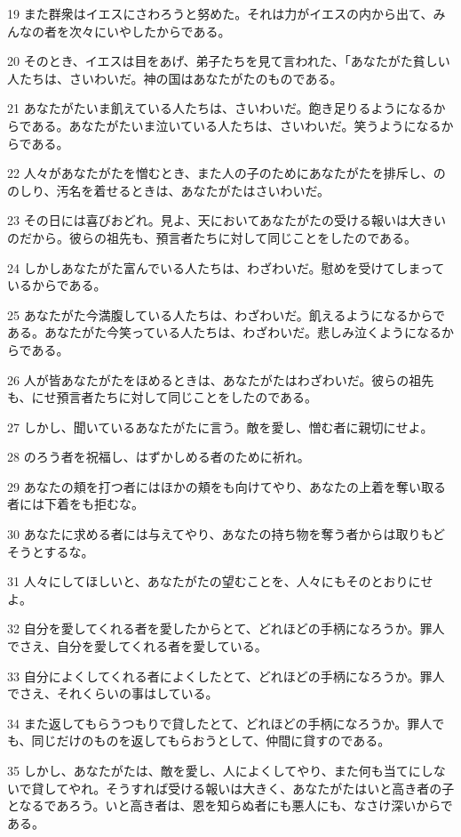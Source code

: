 \par 19 また群衆はイエスにさわろうと努めた。それは力がイエスの内から出て、みんなの者を次々にいやしたからである。
\par 20 そのとき、イエスは目をあげ、弟子たちを見て言われた、「あなたがた貧しい人たちは、さいわいだ。神の国はあなたがたのものである。
\par 21 あなたがたいま飢えている人たちは、さいわいだ。飽き足りるようになるからである。あなたがたいま泣いている人たちは、さいわいだ。笑うようになるからである。
\par 22 人々があなたがたを憎むとき、また人の子のためにあなたがたを排斥し、ののしり、汚名を着せるときは、あなたがたはさいわいだ。
\par 23 その日には喜びおどれ。見よ、天においてあなたがたの受ける報いは大きいのだから。彼らの祖先も、預言者たちに対して同じことをしたのである。
\par 24 しかしあなたがた富んでいる人たちは、わざわいだ。慰めを受けてしまっているからである。
\par 25 あなたがた今満腹している人たちは、わざわいだ。飢えるようになるからである。あなたがた今笑っている人たちは、わざわいだ。悲しみ泣くようになるからである。
\par 26 人が皆あなたがたをほめるときは、あなたがたはわざわいだ。彼らの祖先も、にせ預言者たちに対して同じことをしたのである。
\par 27 しかし、聞いているあなたがたに言う。敵を愛し、憎む者に親切にせよ。
\par 28 のろう者を祝福し、はずかしめる者のために祈れ。
\par 29 あなたの頬を打つ者にはほかの頬をも向けてやり、あなたの上着を奪い取る者には下着をも拒むな。
\par 30 あなたに求める者には与えてやり、あなたの持ち物を奪う者からは取りもどそうとするな。
\par 31 人々にしてほしいと、あなたがたの望むことを、人々にもそのとおりにせよ。
\par 32 自分を愛してくれる者を愛したからとて、どれほどの手柄になろうか。罪人でさえ、自分を愛してくれる者を愛している。
\par 33 自分によくしてくれる者によくしたとて、どれほどの手柄になろうか。罪人でさえ、それくらいの事はしている。
\par 34 また返してもらうつもりで貸したとて、どれほどの手柄になろうか。罪人でも、同じだけのものを返してもらおうとして、仲間に貸すのである。
\par 35 しかし、あなたがたは、敵を愛し、人によくしてやり、また何も当てにしないで貸してやれ。そうすれば受ける報いは大きく、あなたがたはいと高き者の子となるであろう。いと高き者は、恩を知らぬ者にも悪人にも、なさけ深いからである。
